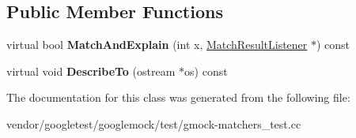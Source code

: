 \subsection*{Public Member Functions}
\begin{DoxyCompactItemize}
\item 
\mbox{\label{classtesting_1_1gmock__matchers__test_1_1_even_matcher_impl_a0ca990403daf3856cda897e4b1a02ae4}} 
virtual bool {\bfseries Match\+And\+Explain} (int x, \mbox{\hyperlink{classtesting_1_1_match_result_listener}{Match\+Result\+Listener}} $\ast$) const
\item 
\mbox{\label{classtesting_1_1gmock__matchers__test_1_1_even_matcher_impl_ae72d37964b4004dfa3a04d7b529ad2f9}} 
virtual void {\bfseries Describe\+To} (ostream $\ast$os) const
\end{DoxyCompactItemize}


The documentation for this class was generated from the following file\+:\begin{DoxyCompactItemize}
\item 
vendor/googletest/googlemock/test/gmock-\/matchers\+\_\+test.\+cc\end{DoxyCompactItemize}
